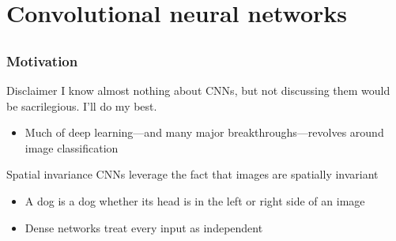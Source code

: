 \section[CNNs]{Convolutional neural networks}

\subsection{}

\begin{frame}
    \frametitle{Motivation}

    \begin{block}{Disclaimer}
        I know almost nothing about CNNs, but not discussing them would be sacrilegious.
        I'll do my best.
    \end{block}
    \pause

    \begin{itemize}
        \item Much of deep learning---and many major breakthroughs---revolves around image classification
    \end{itemize}
    \pause

    \begin{block}{Spatial invariance}
        CNNs leverage the fact that images are \alert{spatially invariant}
        \begin{itemize}
            \item A dog is a dog whether its head is in the left or right side of an image
            \item Dense networks treat every input as independent
        \end{itemize}
    \end{block}
\end{frame}

